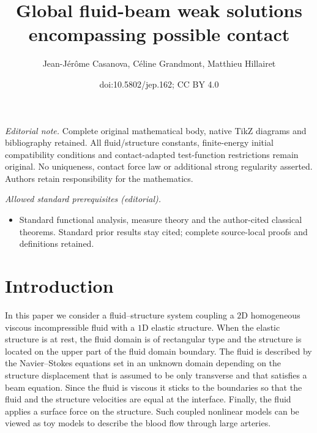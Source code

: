 \documentclass[10pt]{amsart}
\title{Global fluid-beam weak solutions encompassing possible contact}
\author{Jean-Jérôme Casanova, Céline Grandmont, Matthieu Hillairet}
\date{doi:10.5802/jep.162; CC BY 4.0}
\theoremstyle{remark}
\theoremstyle{definition}
\providecommand{\mainmatter}{}\providecommand{\backmatter}{}
\begin{document}
\maketitle
\noindent\textit{Editorial note.} Complete original mathematical body, native TikZ diagrams and bibliography retained. All fluid/structure constants, finite-energy initial compatibility conditions and contact-adapted test-function restrictions remain original. No uniqueness, contact force law or additional strong regularity asserted. Authors retain responsibility for the mathematics.\par\medskip
\noindent\textit{Allowed standard prerequisites (editorial).}\begin{itemize}
\item Standard functional analysis, measure theory and the author-cited classical theorems. Standard prior results stay cited; complete source-local proofs and definitions retained.
\end{itemize}\medskip
\vspace*{-\baselineskip}\enlargethispage{.5\baselineskip}%
\tableofcontents
\mainmatter

\section{Introduction}

In this paper we consider a fluid--structure system coupling a $2$D homogeneous viscous incompressible fluid with a $1$D
elastic structure. When the elastic structure is at rest, the fluid domain is of rectangular type and the structure is located on the upper part of the fluid domain boundary. The fluid is described by the Navier--Stokes equations set in an unknown domain depending on the structure displacement that is assumed to be only transverse and that satisfies a beam equation. Since the fluid is viscous it sticks to the boundaries so that the fluid and the structure velocities are equal at the interface. Finally, the fluid applies a surface force on the structure. Such coupled nonlinear models can be viewed as toy models to describe the blood flow through large arteries.\enlargethispage{\baselineskip}%
\end{document}
